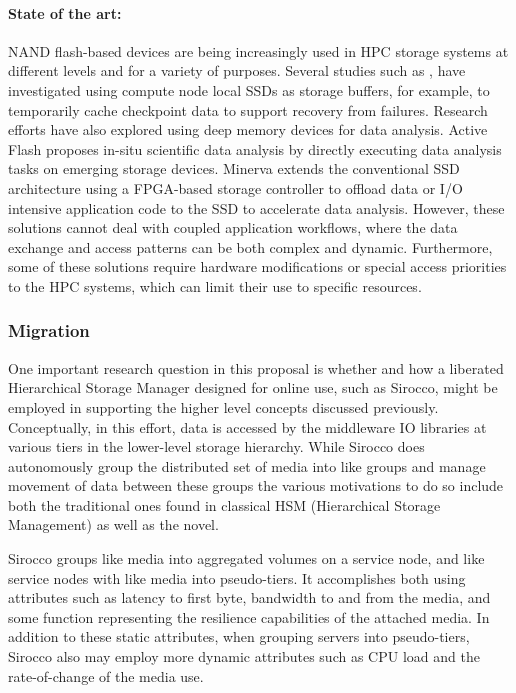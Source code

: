 \paragraph{State of the art:} NAND flash-based devices are being
increasingly used in HPC storage systems at different levels and for a
variety of purposes. Several studies such as \cite{multitier}, \cite{sc10li}
have investigated using compute node local SSDs as storage buffers, for
example, to temporarily cache checkpoint data to support recovery from
failures. Research efforts have also explored using deep memory devices for
data analysis. Active Flash \cite{activeflash} proposes in-situ scientific
data analysis by directly executing data analysis tasks on emerging storage
devices. Minerva \cite{minerva} extends the conventional SSD architecture
using a FPGA-based storage controller to offload data or I/O intensive
application code to the SSD to accelerate data analysis. However, these
solutions cannot deal with coupled application workflows, where the data
exchange and access patterns can be both complex and dynamic. Furthermore,
some of these solutions require hardware modifications or special access
priorities to the HPC systems, which can limit their use to specific
resources.

\subsubsection{Migration}
\label{sec:migration}

One important research question in this proposal is whether and how a liberated
Hierarchical Storage Manager designed for online use, such as Sirocco, might be
employed in supporting the higher level concepts discussed previously.
Conceptually, in this effort, data is accessed by the middleware IO libraries
at various tiers in the lower-level storage hierarchy. While Sirocco does
autonomously group the distributed set of media into like groups and manage
movement of data between these groups the various motivations to do so include
both the traditional ones found in classical HSM (Hierarchical Storage
Management) as well as the novel.

Sirocco groups like media into aggregated volumes on a service node, and like
service nodes with like media into pseudo-tiers. It accomplishes both using
attributes such as latency to first byte, bandwidth to and from the media, and
some function representing the resilience capabilities of the attached media.
In addition to these static attributes, when grouping servers into
pseudo-tiers, Sirocco also may employ more dynamic attributes such as CPU load
and the rate-of-change of the media use.

